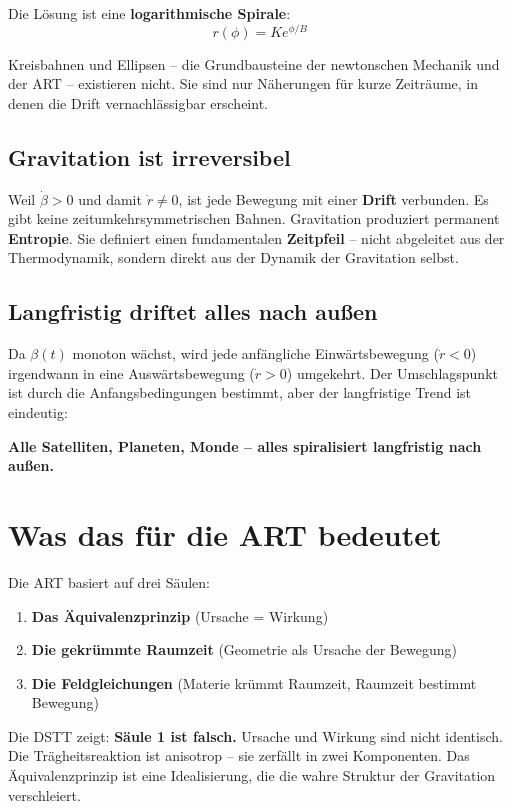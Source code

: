 \documentclass[12pt,a4paper]{article}
\begin{document}
Die Lösung ist eine \textbf{logarithmische Spirale}:
\[
r(\phi) = K e^{\phi/B}
\]

Kreisbahnen und Ellipsen – die Grundbausteine der newtonschen Mechanik und der ART – existieren nicht. Sie sind nur Näherungen für kurze Zeiträume, in denen die Drift vernachlässigbar erscheint.

\subsection{Gravitation ist irreversibel}

Weil \(\dot{\beta} > 0\) und damit \(\dot{r} \neq 0\), ist jede Bewegung mit einer \textbf{Drift} verbunden. Es gibt keine zeitumkehrsymmetrischen Bahnen. Gravitation produziert permanent \textbf{Entropie}. Sie definiert einen fundamentalen \textbf{Zeitpfeil} – nicht abgeleitet aus der Thermodynamik, sondern direkt aus der Dynamik der Gravitation selbst.

\subsection{Langfristig driftet alles nach außen}

Da \(\beta(t)\) monoton wächst, wird jede anfängliche Einwärtsbewegung (\(\dot{r} < 0\)) irgendwann in eine Auswärtsbewegung (\(\dot{r} > 0\)) umgekehrt. Der Umschlagspunkt ist durch die Anfangsbedingungen bestimmt, aber der langfristige Trend ist eindeutig:

\textbf{Alle Satelliten, Planeten, Monde – alles spiralisiert langfristig nach außen.}

\section{Was das für die ART bedeutet}

Die ART basiert auf drei Säulen:

\begin{enumerate}
    \item \textbf{Das Äquivalenzprinzip} (Ursache = Wirkung)
    \item \textbf{Die gekrümmte Raumzeit} (Geometrie als Ursache der Bewegung)
    \item \textbf{Die Feldgleichungen} (Materie krümmt Raumzeit, Raumzeit bestimmt Bewegung)
\end{enumerate}

Die DSTT zeigt: \textbf{Säule 1 ist falsch.} Ursache und Wirkung sind nicht identisch. Die Trägheitsreaktion ist anisotrop – sie zerfällt in zwei Komponenten. Das Äquivalenzprinzip ist eine Idealisierung, die die wahre Struktur der Gravitation verschleiert.
\end{document}
